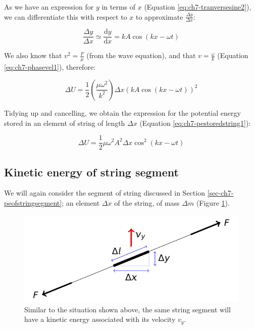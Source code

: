 \documentclass[
]{book}
\begin{document}
As we have an expression for \(y\) in terms of \(x\) (Equation \eqref{eq:ch7-tranversesine2}), we can differentiate this with respect to \(x\) to approximate \(\frac{\Delta y}{\Delta x}\):

\begin{equation}
\frac{\Delta y}{\Delta x} \simeq \frac{\mathrm{d} y}{\mathrm{d} x} = kA \cos (kx - \omega t)
\end{equation}

We also know that \(v^2 = \frac{F}{\mu}\) (from the wave equation), and that \(v = \frac{\omega}{k}\) (Equation \eqref{eq:ch7-phasevel1}), therefore:

\begin{equation}
\Delta U = \frac{1}{2} \left( \frac{\mu \omega^2}{k^2} \right) \Delta x \left( kA \cos (kx - \omega t) \right)^2
\end{equation}

Tidying up and cancelling, we obtain the expression for the potential energy stored in an element of string of length \(\Delta x\) (Equation \eqref{eq:ch7-pestoredstring1}):

\begin{equation}
\Delta U = \frac{1}{2} \mu \omega^2 A^2 \Delta x \cos^2(kx-\omega t)
\label{eq:ch7-pestoredstring1}
\end{equation}

\hypertarget{sec-ch7-keofstringsegment}{%
\subsection{Kinetic energy of string segment}\label{sec-ch7-keofstringsegment}}

We will again consider the segment of string discussed in Section \ref{sec-ch7-peofstringsegment}; an element \(\Delta x\) of the string, of mass \(\Delta m\) (Figure \ref{fig:ch7-kestringsegment}).

\begin{figure}

{\centering \includegraphics[width=0.7\linewidth]{visualisations/LaTeX/ch7-keofstringsegment} 

}

\caption{Similar to the situation shown above, the same string segment will have a kinetic energy associated with its velocity $v_y$.}\label{fig:ch7-kestringsegment}
\end{figure}
\end{document}
